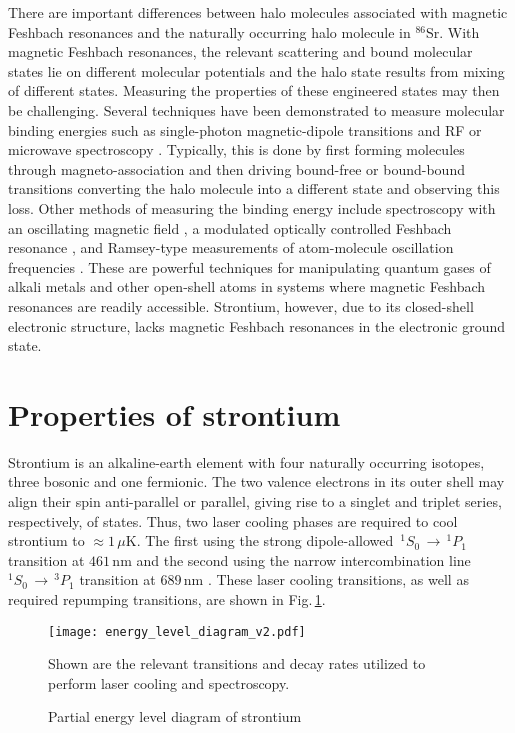 There are important differences between halo molecules associated with magnetic Feshbach resonances and the naturally occurring halo molecule in $^{86}$Sr. 
With magnetic Feshbach resonances, the relevant scattering and bound molecular states lie on different molecular potentials and the halo state results from mixing of different states.
Measuring the properties of these engineered states may then be challenging.
Several techniques have been demonstrated to measure molecular binding energies such as single-photon magnetic-dipole transitions and RF or microwave spectroscopy \cite{Chin2010,cju05,thw95b}. 
Typically, this is done by first forming molecules through magneto-association and then driving bound-free or bound-bound transitions converting the halo molecule into a different state and observing this loss.
Other methods of measuring the binding energy include spectroscopy with an oscillating magnetic field \cite{thw95b}, a modulated optically controlled Feshbach resonance \cite{chx15}, and Ramsey-type measurements of atom-molecule oscillation frequencies \cite{ckt03}. 
These are powerful techniques for manipulating quantum gases of alkali metals and other open-shell atoms in systems where magnetic Feshbach resonances are readily accessible.
Strontium, however, due to its closed-shell electronic structure, lacks magnetic Feshbach resonances in the electronic ground state.


\section{Properties of strontium} \label{sec:sr}
Strontium is an alkaline-earth element with four naturally occurring isotopes, three bosonic and one fermionic.
The two valence electrons in its outer shell may align their spin anti-parallel or parallel, giving rise to a singlet and triplet series, respectively, of states.
Thus, two laser cooling phases are required to cool strontium to $\approx\!1\,\mu$K.
The first using the strong dipole-allowed $\,^1S_0\,\rightarrow\,^1P_1$ transition at $461$\,nm and the second using the narrow intercombination line $^1S_0\,\rightarrow\,^3P_1$ transition at $689$\,nm \cite{Katori1999,Ido2000,Mukaiyama2003a,Loftus2004,Ciuryo2004,Nagel2005a,Mickelson2005}.
These laser cooling transitions, as well as required repumping transitions, are shown in Fig.\,\ref{fig:energyLevels}.
	\begin{figure} 
		\centerline{
		\texttt{[image: energy\_level\_diagram\_v2.pdf]}}
		\caption{Partial energy level diagram of strontium}{Shown are the relevant transitions and decay rates utilized to perform laser cooling and spectroscopy.}
		\label{fig:energyLevels}
	\end{figure}
	
